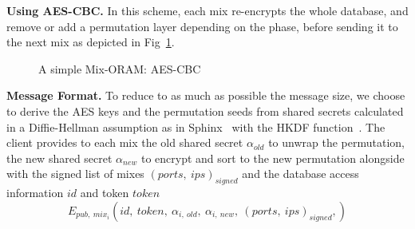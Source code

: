 \documentclass{llncs}
\begin{document}
\noindent\textbf{Using AES-CBC.} In this scheme, each mix re-encrypts the whole database, and remove or add a permutation layer depending on the phase, before sending it to the next mix as depicted in Fig~\ref{fig:ASMO_CBC}.\\
%
\begin{figure}
\centering
\begin{adjustbox}{width=\textwidth}
\end{adjustbox}
\caption{A simple Mix-ORAM: AES-CBC} \label{fig:ASMO_CBC}
\end{figure} 

\noindent\textbf{Message Format.}
To reduce to as much as possible the message size, we choose to derive the AES keys and the permutation seeds from shared secrets calculated in a Diffie-Hellman assumption as in Sphinx~\cite{danezis2009sphinx} with the HKDF function~\cite{krawczyk2010cryptographic}.
The client provides to each mix the old shared secret $\alpha_{old}$ to unwrap the permutation, the new shared secret $\alpha_{new}$ to encrypt and sort to the new permutation alongside with the signed list of mixes $(ports,\ ips)_{signed}$ and the database access information $id$ and token $token$
$$E_{pub,\ mix_i}\left ( id,\ token,\ \alpha_{i,\ old},\ \alpha_{i,\ new},\ (ports,\ ips)_{signed}, \right) $$
\end{document}
